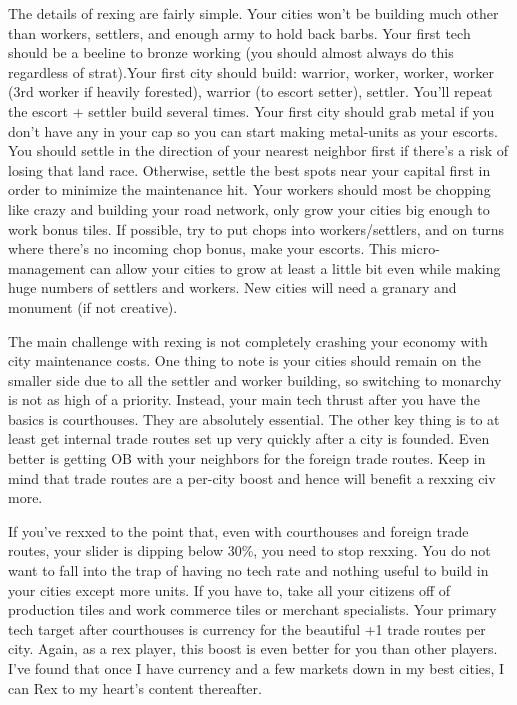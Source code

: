 \documentclass[10pt]{article}
\begin{document}
The details of rexing are fairly simple. Your cities won't be building
much other than workers, settlers, and enough army to hold back
barbs. Your first tech should be a beeline to bronze working (you
should almost always do this regardless of strat).Your first city
should build: warrior, worker, worker, worker (3rd worker if heavily
forested), warrior (to escort setter), settler. You'll repeat the
escort + settler build several times. Your first city should grab
metal if you don't have any in your cap so you can start making
metal-units as your escorts. You should settle in the direction of
your nearest neighbor first if there's a risk of losing that land
race. Otherwise, settle the best spots near your capital first in
order to minimize the maintenance hit. Your workers should most be
chopping like crazy and building your road network, only grow your
cities big enough to work bonus tiles. If possible, try to put chops
into workers/settlers, and on turns where there's no incoming chop
bonus, make your escorts. This micro-management can allow your cities
to grow at least a little bit even while making huge numbers of
settlers and workers. New cities will need a granary and monument (if
not creative).

The main challenge with rexing is not completely crashing your economy
with city maintenance costs. One thing to note is your cities should
remain on the smaller side due to all the settler and worker building,
so switching to monarchy is not as high of a priority.  Instead, your
main tech thrust after you have the basics is courthouses. They are
absolutely essential. The other key thing is to at least get internal
trade routes set up very quickly after a city is founded. Even better
is getting OB with your neighbors for the foreign trade routes. Keep
in mind that trade routes are a per-city boost and hence will benefit
a rexxing civ more.

If you've rexxed to the point that, even with courthouses and foreign
trade routes, your slider is dipping below 30\%, you need to stop
rexxing. You do not want to fall into the trap of having no tech rate
and nothing useful to build in your cities except more units. If you
have to, take all your citizens off of production tiles and work
commerce tiles or merchant specialists.  Your primary tech target
after courthouses is currency for the beautiful +1 trade routes per
city. Again, as a rex player, this boost is even better for you than
other players. I've found that once I have currency and a few markets
down in my best cities, I can Rex to my heart's content thereafter.
\end{document}

